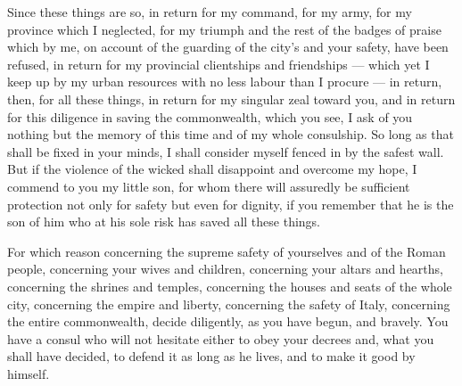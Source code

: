  Since these things are so, in return for my command, for my army, for my province which I neglected, for my triumph and the rest of the badges of praise which by me, on account of the guarding of the city's and your safety, have been refused, in return for my provincial clientships and friendships --- which yet I keep up by my urban resources with no less labour than I procure --- in return, then, for all these things, in return for my singular zeal toward you, and in return for this diligence in saving the commonwealth, which you see, I ask of you nothing but the memory of this time and of my whole consulship. So long as that shall be fixed in your minds, I shall consider myself fenced in by the safest wall. But if the violence of the wicked shall disappoint and overcome my hope, I commend to you my little son, for whom there will assuredly be sufficient protection not only for safety but even for dignity, if you remember that he is the son of him who at his sole risk has saved all these things.

 For which reason concerning the supreme safety of yourselves and of the Roman people, concerning your wives and children, concerning your altars and hearths, concerning the shrines and temples, concerning the houses and seats of the whole city, concerning the empire and liberty, concerning the safety of Italy, concerning the entire commonwealth, decide diligently, as you have begun, and bravely. You have a consul who will not hesitate either to obey your decrees and, what you shall have decided, to defend it as long as he lives, and to make it good by himself.
